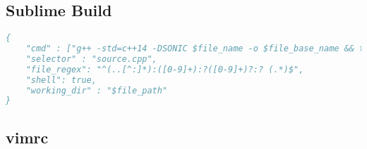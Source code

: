 \subsection*{Sublime Build}
\begin{lstlisting}[language= Pascal, commentstyle=\color{black}, numberstyle=\tiny\color{black}, keywordstyle=\color{black}, stringstyle=\color{black},
]
{
    "cmd" : ["g++ -std=c++14 -DSONIC $file_name -o $file_base_name && timeout 4s ./$file_base_name<inputf.in>outputf.in"], 
    "selector" : "source.cpp",
    "file_regex": "^(..[^:]*):([0-9]+):?([0-9]+)?:? (.*)$",
    "shell": true,
    "working_dir" : "$file_path"
}
\end{lstlisting}
\subsection*{vimrc}

